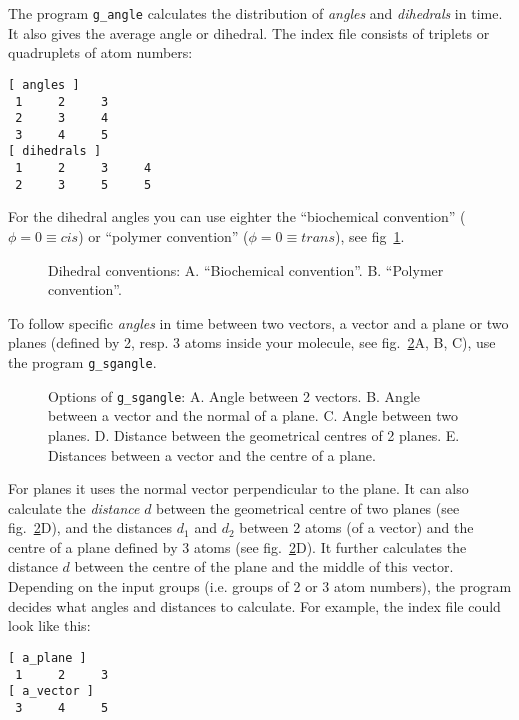 The program {\tt g\_angle} calculates the distribution of {\em angles} and 
{\em dihedrals} in time. It also gives the average angle or dihedral. 
The index file consists of triplets or quadruplets of atom numbers:
{\samepage
\begin{verbatim}
[ angles ]
 1     2     3
 2     3     4
 3     4     5
[ dihedrals ]
 1     2     3     4
 2     3     5     5
\end{verbatim}
}
For the dihedral angles you can use eighter the ``biochemical convention'' 
($\phi = 0 \equiv cis$) or ``polymer convention'' ($\phi = 0 \equiv trans$), 
see fig~\ref{fig:dih_def}.
%
\begin{figure}
\centerline{
{}}
\caption{Dihedral conventions: A. ``Biochemical convention''. B. ``Polymer convention''.}
\label{fig:dih_def}
\end{figure}
%

To follow specific {\em angles} in time between two vectors, a vector and 
a plane or 
two planes (defined by 2, resp. 3 atoms inside your molecule, see 
fig.~\ref{fig:sgangle}A, B, C), use the program {\tt g\_sgangle}. 
%
\begin{figure}
\centerline{
{}}
\caption[Options of {\tt g\_sgangle}.]{Options of {\tt g\_sgangle}: A. Angle between 2 vectors. B. Angle between a vector and the normal of a plane. C. Angle between two planes. D. Distance between the geometrical centres of 2 planes. E. Distances between a vector and the centre of a plane.}
\label{fig:sgangle}
\end{figure}
%
For planes it uses the normal vector perpendicular to the plane. 
It can also calculate the {\em distance} $d$ between the geometrical centre 
of two planes (see fig.~\ref{fig:sgangle}D), and the distances 
$d_1$ and $d_2$ between 2 atoms (of a vector) and the centre of a plane 
defined by 3 atoms (see fig.~\ref{fig:sgangle}D). It further calculates the 
distance $d$ between the centre of the plane and the middle of this vector. 
Depending on the input groups (i.e. groups of 2 or 3 atom numbers), the 
program decides what angles and distances to calculate. For example, the index
file could look like this:
{\samepage
\begin{verbatim}
[ a_plane ]
 1     2     3
[ a_vector ]
 3     4     5
\end{verbatim}
}
%
%
